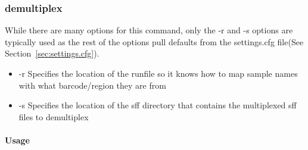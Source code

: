 \documentclass{article}
\begin{document}
\subsubsection{demultiplex}
While there are many options for this command, only the -r and -s options are typically used as the rest of the options pull defaults from the settings.cfg file(See Section~\ref{sec:settings.cfg}).
\begin{itemize}
 \item -r Specifies the location of the runfile so it knows how to map sample names with what barcode/region they are from
 \item -s Specifies the location of the sff directory that contains the multiplexed sff files to demultiplex
\end{itemize}

\paragraph{Usage}
\end{document}
